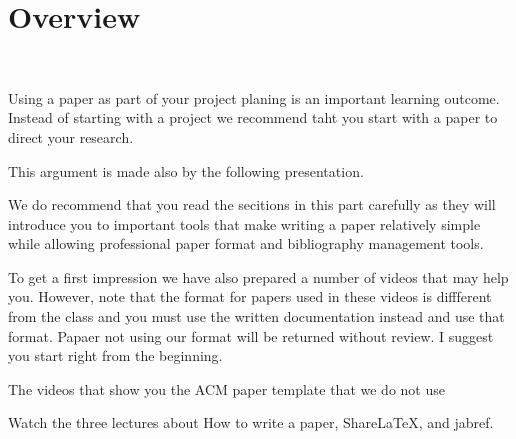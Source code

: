\section{Overview}\label{C:overview-doc}

\FILENAME\

Using a paper as part of your project planing is an important learning
outcome. Instead of starting with a project we recommend taht you
start with a paper to direct your research.

This argument is made also by the following presentation.


We do recommend that you read the secitions in this part carefully as they will introduce you to important tools that make writing a paper relatively simple while allowing professional paper format and bibliography management tools.

To get a first impression we have also prepared a number of videos that may help you. However, note that the format for papers used in these videos is diffferent from the class and you must use the written documentation instead and use that format. Papaer not using our format will be returned without review. I suggest you start right from the beginning.

\begin{WARNING}
The videos that show you the ACM paper template that we do not use



\end{WARNING}

\begin{exercise}\label{E:Documentation.1}
Watch the three lectures about How to write a paper, ShareLaTeX, and jabref.
\end{exercise}
